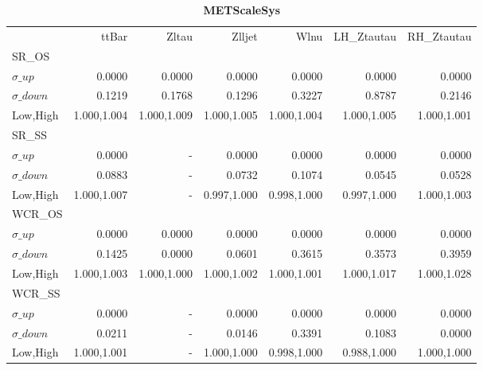 \documentclass[11pt,oneside,a4paper]{article}
\begin{document}
\begin{table}
\caption{\bf{METScaleSys}}
\centering
\begin{tabular}{lrrrrrr}
& ttBar & Zltau & Zlljet & Wlnu & LH\_Ztautau & RH\_Ztautau \\

SR\_OS &  &  &  &  &  &  \\
$\sigma\_up$ & 0.0000 & 0.0000 & 0.0000 & 0.0000 & 0.0000 & 0.0000 \\
$\sigma\_down$ & 0.1219 & 0.1768 & 0.1296 & 0.3227 & 0.8787 & 0.2146 \\
Low,High & 1.000,1.004 & 1.000,1.009 & 1.000,1.005 & 1.000,1.004 & 1.000,1.005 & 1.000,1.001 \\

\hline
SR\_SS &  &  &  &  &  &  \\
$\sigma\_up$ & 0.0000 & - & 0.0000 & 0.0000 & 0.0000 & 0.0000 \\
$\sigma\_down$ & 0.0883 & - & 0.0732 & 0.1074 & 0.0545 & 0.0528 \\
Low,High & 1.000,1.007 & - & 0.997,1.000 & 0.998,1.000 & 0.997,1.000 & 1.000,1.003 \\

\hline
WCR\_OS &  &  &  &  &  &  \\
$\sigma\_up$ & 0.0000 & 0.0000 & 0.0000 & 0.0000 & 0.0000 & 0.0000 \\
$\sigma\_down$ & 0.1425 & 0.0000 & 0.0601 & 0.3615 & 0.3573 & 0.3959 \\
Low,High & 1.000,1.003 & 1.000,1.000 & 1.000,1.002 & 1.000,1.001 & 1.000,1.017 & 1.000,1.028 \\

\hline
WCR\_SS &  &  &  &  &  &  \\
$\sigma\_up$ & 0.0000 & - & 0.0000 & 0.0000 & 0.0000 & 0.0000 \\
$\sigma\_down$ & 0.0211 & - & 0.0146 & 0.3391 & 0.1083 & 0.0000 \\
Low,High & 1.000,1.001 & - & 1.000,1.000 & 0.998,1.000 & 0.988,1.000 & 1.000,1.000 \\
\hline
\end{tabular}
\end{table}
\end{document}
